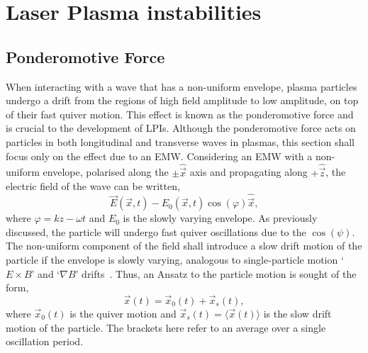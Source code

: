 \section{Laser Plasma instabilities}%
\label{sec:theory_LPIs}

\subsection{Ponderomotive  Force}%
\label{sec:theory_ponderomotive }

When interacting with a wave that has a non-uniform envelope, plasma particles undergo a drift from the regions of high field amplitude to low amplitude, on top of their fast quiver motion.
This effect is known as the ponderomotive force and is crucial to the development of \ac{LPIs}.
Although the ponderomotive force acts on particles in both longitudinal and transverse waves in plasmas, this section shall focus only on the effect due to an \ac{EMW}.
Considering an \ac{EMW} with a non-uniform envelope, polarised along the $\pm \hat{\vec{x}}$ axis and propagating along $+\hat{\vec{z}}$, the electric field of the wave can be written,
\begin{equation}
    \vec{E}(\vec{x},t) - E_0(\vec{x},t)\cos{(\varphi)}\hat{\vec{x}},
\end{equation}
where $\varphi = kz - \omega t$ and $E_0$ is the slowly varying envelope.
As previously discussed, the particle will undergo fast quiver oscillations due to the $\cos{(\psi)}$.
The non-uniform component of the field shall introduce a slow drift motion of the particle if the envelope is slowly varying, analogous to single-particle motion `$E\times B$' and `$\nabla B$' drifts~\cite{chen_introduction_2018}.
Thus, an Ansatz to the particle motion is sought of the form,
\begin{equation}
    \label{eq:theory_ponder_ansatz}
    \vec{x}(t) = \vec{x}_0(t) + \vec{x}_s(t),
\end{equation}
where $\vec{x}_0(t)$ is the quiver motion and $\vec{x}_s(t)=\langle\vec{x}(t)\rangle$ is the slow drift motion of the particle.
The brackets here refer to an average over a single oscillation period.

